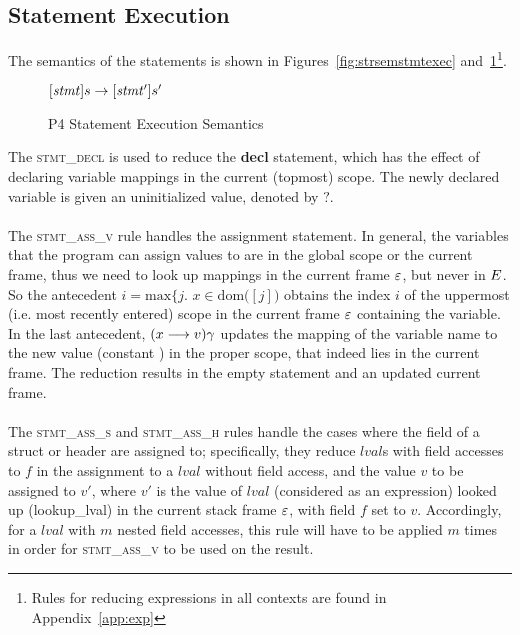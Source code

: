 \documentclass[UTF8]{article}
\begin{document}
\newpage
\subsection{Statement Execution}
The semantics of the statements is shown in Figures~\ref{fig:strsemstmtexec} and~\ref{fig:semstmtexec}\footnote{Rules for reducing expressions in all contexts are found in Appendix~\ref{app:exp}}.


\begin{figure}[ht!]
\begin{ottdefnblock}{$[  \mathit{stmt}  ]  s  \rightarrow  [  \mathit{stmt'}  ]  s'$}{}
\ottusedrule{\ottdrulestmtXXdecl{}}
\ottusedrule{\ottdrulestmtXXassXXv{}}
\ottusedrule{\ottdrulestmtXXassXXs{}}
\ottusedrule{\ottdrulestmtXXassXXh{}}
\ottusedrule{\ottdrulestmtXXret{}}
\ottusedrule{\ottdrulestmtXXcondTwo{}}
\ottusedrule{\ottdrulestmtXXcondThree{}}
\end{ottdefnblock}
\caption{P4 Statement Execution Semantics}
\label{fig:semstmtexec}
\end{figure}
The \textsc{stmt\_decl} is used to reduce the \textbf{decl} statement, which has the effect of declaring variable mappings in the current (topmost) scope. The newly declared variable is given an uninitialized value, denoted by $?$.
\\~\\
The \textsc{stmt\_ass\_v} rule handles the assignment statement. In general, the variables that the program can assign values to are in the global scope \gscope{} or the current frame, thus we need to look up mappings in the current frame $\varepsilon$, but never in $E$. So the antecedent $i = \mathrm{max} \{ j . \,\, x  \in \mathrm{dom} ( $\currsf$ [j] ) $ obtains the index $i$ of the uppermost (i.e. most recently entered) scope in the current frame $\varepsilon$ containing the variable. In the last antecedent, $ (x \longrightarrow v )\gamma $ updates the mapping of the variable name \vn{} to the new value (constant \cval{}) in the proper scope, that indeed lies in the current frame. The reduction results in the empty statement and an updated current frame.
\\~\\
The \textsc{stmt\_ass\_s} and \textsc{stmt\_ass\_h} rules handle the cases where the field of a struct or header are assigned to; specifically, they reduce $lval$s with field accesses to $f$ in the assignment to a $lval$ without field access, and the value $v$ to be assigned to $v'$, where $v'$ is the value of $lval$ (considered as an expression) looked up (lookup\_lval) in the current stack frame $\varepsilon$, with field $f$ set to $v$. Accordingly, for a $lval$ with $m$ nested field accesses, this rule will have to be applied $m$ times in order for \textsc{stmt\_ass\_v} to be used on the result.
\end{document}
